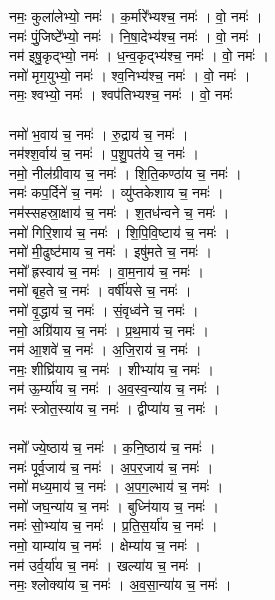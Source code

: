 नमः॒ कुला॑लेभ्यो॒ नमः॑ । क॒र्मारे᳚भ्यश्च॒ नमः॑ । वो॒ नमः॑ ।\\
नमः॑ पुं॒जिष्टे᳚भ्यो॒ नमः॑ । नि॒षा॒देभ्य॑श्च॒ नमः॑ । वो॒ नमः॑ ।\\
नम॑ इषु॒कृद्भ्यो॒ नमः॑ । ध॒न्व॒कृद्भ्य॑श्च॒ नमः॑ । वो॒ नमः॑ ।\\
नमो॑ मृग॒युभ्यो॒ नमः॑ । श्व॒निभ्य॑श्च॒ नमः॑ । वो॒ नमः॑ ।\\
नमः॒ श्वभ्यो॒ नमः॑ । श्वप॑तिभ्यश्च॒ नमः॑ । वो॒ नमः॑\\
\\
नमो॑ भ॒वाय॑ च॒ नमः॑ । रु॒द्राय॑ च॒ नमः॑ ।\\
नम॑श्श॒र्वाय॑ च॒ नमः॑ । प॒शु॒पत॑ये च॒ नमः॑ ।\\
नमो॒ नील॑ग्रीवाय च॒ नमः॑ । शि॒ति॒कण्ठा॑य च॒ नमः॑ ।\\
नमः॑ कप॒र्दिने॑ च॒ नमः॑ । व्यु॑प्तकेशाय च॒ नमः॑ ।\\
नम॑स्सहस्रा॒क्षाय॑ च॒ नमः॑ । श॒तध॑न्वने च॒ नमः॑ ।\\
नमो॑ गिरि॒शाय॑ च॒ नमः॑ । शि॒पि॒वि॒ष्टाय॑ च॒ नमः॑ ।\\
नमो॑ मी॒ढुष्ट॑माय च॒ नमः॑ । इषु॑मते च॒ नमः॑ ।\\
नमो᳚ ह्रस्वाय॑ च॒ नमः॑ । वा॒म॒नाय॑ च॒ नमः॑ ।\\
नमो॑ बृह॒ते च॒ नमः॑ । वर्षी॑यसे च॒ नमः॑ ।\\
नमो॑ वृ॒द्धाय॑ च॒ नमः॑ । सं॒वृध्व॑ने च॒ नमः॑ ।\\
नमो॒ अग्रि॑याय च॒ नमः॑ । प्र॒थ॒माय॑ च॒ नमः॑ ।\\
नम॑ आ॒शवे॑ च॒ नमः॑ । अ॒जि॒राय॑ च॒ नमः॑ ।\\
नमः॒ शीघ्रि॑याय च॒ नमः॑ । शीभ्या॑य च॒ नमः॑ ।\\
नम॑ ऊ॒र्म्या॑य च॒ नमः॑ । अ॒व॒स्व॒न्या॑य च॒ नमः॑ ।\\
नमः॑ स्त्रोत॒स्या॑य च॒ नमः॑ । द्वीप्या॑य च॒ नमः॑ ।\\
\\
नमो᳚ ज्ये॒ष्ठाय॑ च॒ नमः॑ । क॒नि॒ष्ठाय॑ च॒ नमः॑ ।\\
नमः॑ पूर्व॒जाय॑ च॒ नमः॑ । अ॒प॒र॒जाय॑ च॒ नमः॑ ।\\
नमो॑ मध्य॒माय॑ च॒ नमः॑ । अ॒प॒ग॒ल्भाय॑ च॒ नमः॑ ।\\
नमो॑ जघ॒न्या॑य च॒ नमः॑ । बुध्नि॑याय च॒ नमः॑ ।\\
नमः॑ सो॒भ्या॑य च॒ नमः॑ । प्र॒ति॒स॒र्या॑य च॒ नमः॑ ।\\
नमो॒ याम्या॑य च॒ नमः॑ । क्षेम्या॑य च॒ नमः॑ ।\\
नम॑ उर्व॒र्या॑य च॒ नमः॑ । खल्या॑य च॒ नमः॑ ।\\
नमः॒ श्लोक्या॑य च॒ नमः॑ । अ॒व॒सा॒न्या॑य च॒ नमः॑ ।\\
